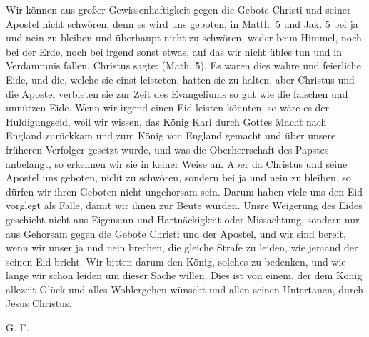 {  Wir können aus großer Gewissenhaftigkeit gegen die Gebote
  Christi und seiner Apostel nicht schwören, denn es wird uns 
  geboten, in Matth. 5 und Jak. 5 
  bei ja und nein zu bleiben und überhaupt nicht zu schwören, 
  weder beim Himmel, noch bei der Erde,
  noch bei irgend sonst etwas, auf das wir nicht übles tun und in
  Verdammnis fallen. Christus sagte:  (Math. 5). Es waren dies wahre und feierliche 
  Eide, und die, welche sie einst leisteten, hatten sie zu halten,
  aber Christus und die Apostel verbieten sie zur Zeit des 
  Evangeliums so gut wie die falschen und unnützen Eide. Wenn wir irgend
  einen Eid leisten könnten, so wäre es der Huldigungseid, weil
  wir wissen, das König Karl durch Gottes Macht nach England
  zurückkam und zum König von England gemacht und über unsere
  früheren Verfolger gesetzt wurde, und was die Oberherrschaft des
  Papstes anbelangt, so erkennen wir sie in keiner Weise an. Aber
  da Christus und seine Apostel uns geboten, nicht zu schwören,
  sondern bei ja und nein zu bleiben, so dürfen wir ihren Geboten
  nicht ungehorsam sein. Darum haben viele uns den Eid vorglegt 
  als Falle, damit wir ihnen zur Beute würden. Unsre
  Weigerung des Eides geschieht nicht aus Eigensinn und 
  Hartnäckigkeit oder Missachtung, sondern nur aus Gehorsam gegen
  die Gebote Christi und der Apostel, und wir sind bereit, wenn wir
  unser ja und nein brechen, die gleiche Strafe zu leiden, wie jemand
  der seinen Eid bricht. Wir bitten darum den König, solches zu
  bedenken, und wie lange wir schon leiden um dieser Sache willen.
  Dies ist von einem, der dem König allezeit Glück und alles
  Wohlergehen wünscht und allen seinen Untertanen, durch Jesus
  Christus.
  \bigskip 
  \begin{flushright}G. F.\end{flushright}

}
